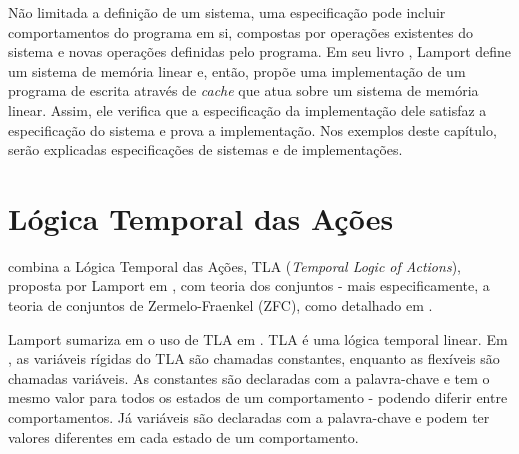 Não limitada a definição de um sistema, uma especificação pode incluir comportamentos do programa em si, compostas por operações existentes do sistema e novas operações definidas pelo programa. Em seu livro \cite{specifying-systems}, Lamport define um sistema de memória linear e, então, propõe uma implementação de um programa de escrita através de \textit{cache} que atua sobre um sistema de memória linear. Assim, ele verifica que a especificação da implementação dele satisfaz a especificação do sistema e prova a implementação. Nos exemplos deste capítulo, serão explicadas especificações de sistemas e de implementações.

\section{Lógica Temporal das Ações}

\TLA combina a Lógica Temporal das Ações, TLA (\textit{Temporal Logic of Actions}), proposta por Lamport em \cite{tlaformalization}, com teoria dos conjuntos - mais especificamente, a teoria de conjuntos de Zermelo-Fraenkel (ZFC), como detalhado em \cite{merzlogic}.

Lamport sumariza em \cite{proofsystem} o uso de TLA em \TLA. TLA é uma lógica temporal linear. Em \TLA, as variáveis rígidas do TLA são chamadas constantes, enquanto as flexíveis são chamadas variáveis. As constantes são declaradas com a palavra-chave \CONSTANTS e tem o mesmo valor para todos os estados de um comportamento - podendo diferir entre comportamentos. Já variáveis são declaradas com a palavra-chave \VARIABLES e podem ter valores diferentes em cada estado de um comportamento.


